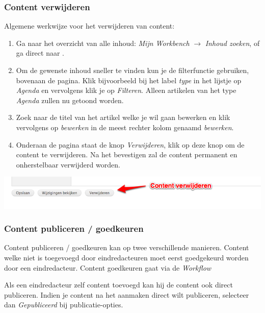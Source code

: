 \subsubsection{Content verwijderen}\label{contentverwijderen}
Algemene werkwijze voor het verwijderen van content:
\begin{enumerate}
\item Ga naar het overzicht van alle inhoud: \emph{Mijn Workbench} $\rightarrow$ \emph{Inhoud zoeken}, of ga direct naar .
\item Om de gewenste inhoud sneller te vinden kun je de filterfunctie gebruiken, bovenaan de pagina. Klik bijvoorbeeld bij het label \emph{type} in het lijstje op \emph{Agenda} en vervolgens klik je op \emph{Filteren}. Alleen artikelen van het type \emph{Agenda} zullen nu getoond worden.
\item Zoek naar de titel van het artikel welke je wil gaan bewerken en klik vervolgens op \emph{bewerken} in de meest rechter kolom genaamd \emph{bewerken}.
\item Onderaan de pagina staat de knop \emph{Verwijderen}, klik op deze knop om de content te verwijderen. Na het bevestigen zal de content permanent en onherstelbaar verwijderd worden.
\end{enumerate}

\bigskip

\begin{center}
	\includegraphics[width=\textwidth]{img/content3.png}
\end{center}

\subsubsection{Content publiceren / goedkeuren}\label{contentpubliceren}
Content publiceren / goedkeuren kan op twee verschillende manieren. Content welke niet is toegevoegd door eindredacteuren moet eerst goedgekeurd worden door een eindredacteur. Content goedkeuren gaat via de \emph{Workflow}

Als een eindredacteur zelf content toevoegd kan hij de content ook direct publiceren. Indien je content na het aanmaken direct wilt publiceren, selecteer dan \emph{Gepubliceerd} bij publicatie-opties. 

